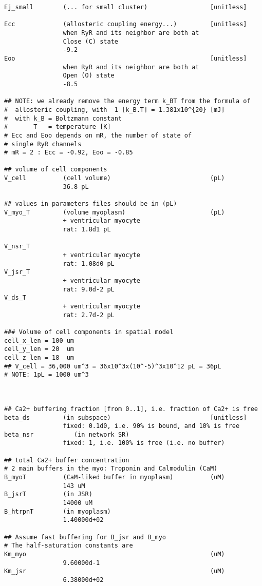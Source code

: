 \begin{verbatim}
Ej_small        (... for small cluster)                 [unitless]

Ecc             (allosteric coupling energy...)         [unitless]
                when RyR and its neighbor are both at 
                Close (C) state
                -9.2
Eoo                                                     [unitless]
                when RyR and its neighbor are both at 
                Open (O) state
                -8.5
                
## NOTE: we already remove the energy term k_BT from the formula of 
#  allosteric coupling, with  1 [k_B.T] = 1.381x10^{20} [mJ]
#  with k_B = Boltzmann constant
#       T   = temperature [K]
# Ecc and Eoo depends on mR, the number of state of 
# single RyR channels
# mR = 2 : Ecc = -0.92, Eoo = -0.85

## volume of cell components
V_cell          (cell volume)                           (pL) 
                36.8 pL

## values in parameters files should be in (pL) 
V_myo_T         (volume myoplasm)                       (pL)
                + ventricular myocyte
                rat: 1.8d1 pL

V_nsr_T
                + ventricular myocyte
                rat: 1.08d0 pL
V_jsr_T
                + ventricular myocyte
                rat: 9.0d-2 pL
V_ds_T
                + ventricular myocyte
                rat: 2.7d-2 pL

### Volume of cell components in spatial model
cell_x_len = 100 um
cell_y_len = 20  um
cell_z_len = 18  um
## V_cell = 36,000 um^3 = 36x10^3x(10^-5)^3x10^12 pL = 36pL 
# NOTE: 1pL = 1000 um^3



## Ca2+ buffering fraction [from 0..1], i.e. fraction of Ca2+ is free
beta_ds         (in subspace)                           [unitless]
                fixed: 0.1d0, i.e. 90% is bound, and 10% is free
beta_nsr           (in network SR)
                fixed: 1, i.e. 100% is free (i.e. no buffer)

## total Ca2+ buffer concentration
# 2 main buffers in the myo: Troponin and Calmodulin (CaM)
B_myoT          (CaM-liked buffer in myoplasm)          (uM)
                143 uM 
B_jsrT          (in JSR)
                14000 uM
B_htrpnT        (in myoplasm)
                1.40000d+02

## Assume fast buffering for B_jsr and B_myo
# The half-saturation constants are
Km_myo                                                  (uM)
                9.60000d-1
Km_jsr                                                  (uM)
                6.38000d+02


\end{verbatim}
